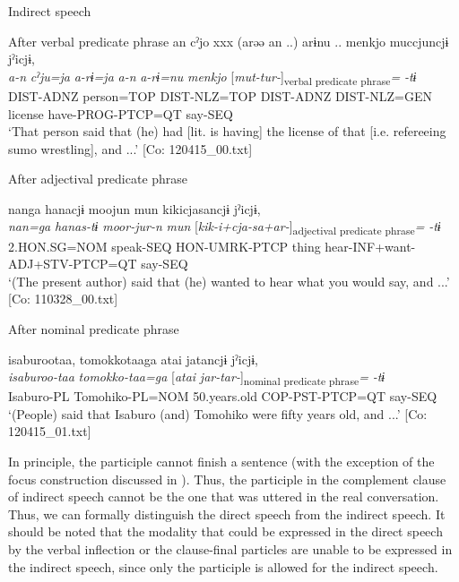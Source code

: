 \ea\label{ex:10.63}   Indirect speech\\
  \begin{xlist}
  \exi{} After verbal predicate phrase
    \ex  %
      \glll    an  cˀjo  xxx  (arəə  an ..)   arɨnu ..  {\textbar}menkjo{\textbar}  muccjuncjɨ  jˀicjɨ,\\
      \textit{a-n}  \textit{cˀju=ja}    \textit{a-rɨ=ja}  \textit{a-n}   \textit{a-rɨ=nu}  \textit{menkjo}  [\textit{mut-tur-}]\textsubscript{verbal predicate phrase}\textit{=}  \textit{-tɨ}\\
      DIST-ADNZ  person=TOP    DIST-NLZ=TOP  DIST-ADNZ   DIST-NLZ=GEN  license  have-PROG-PTCP=QT  say-SEQ\\
      \glt       ‘That person said that (he) had [lit. is having] the license of that [i.e. refereeing sumo wrestling], and ...’ [Co: 120415\_00.txt]

  \exi{} After adjectival predicate phrase

  \ex{}%
      \glll    nanga  hanacjɨ  moojun  mun  kikicjasancjɨ  jˀicjɨ,\\
      \textit{nan=ga}  \textit{hanas-tɨ}  \textit{moor-jur-n}  \textit{mun}   [\textit{kik-i+cja-sa+ar-}]\textsubscript{adjectival predicate phrase}\textit{=}  \textit{-tɨ}\\
      2.HON.SG=NOM  speak-SEQ  HON-UMRK-PTCP  thing  hear-INF+want-ADJ+STV-PTCP=QT  say-SEQ\\
      \glt       ‘(The present author) said that (he) wanted to hear what you would say, and ...’ [Co: 110328\_00.txt]

  \exi{} After nominal predicate phrase

  \ex  %
      \glll    isaburootaa,  tomokkotaaga  atai  jatancjɨ  jˀicjɨ,\\
      \textit{isaburoo-taa}  \textit{tomokko-taa=ga}  [\textit{atai}  \textit{jar-tar-}]\textsubscript{nominal predicate phrase}\textit{=} \textit{-tɨ}\\
      Isaburo-PL  Tomohiko-PL=NOM  50.years.old  COP-PST-PTCP=QT   say-SEQ\\
      \glt       ‘(People) said that Isaburo (and) Tomohiko were fifty years old, and ...’ [Co: 120415\_01.txt]
    \end{xlist}
\z

In principle, the participle cannot finish a sentence (with the exception of the focus construction discussed in ). Thus, the participle in the complement clause of indirect speech cannot be the one that was uttered in the real conversation. Thus, we can formally distinguish the direct speech from the indirect speech. It should be noted that the modality that could be expressed in the direct speech by the verbal inflection or the clause-final particles are unable to be expressed in the indirect speech, since only the participle is allowed for the indirect speech.


